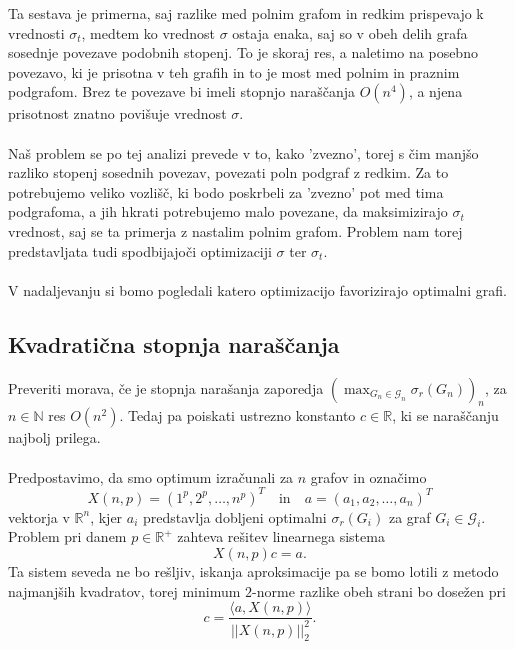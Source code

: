 \documentclass[ letterpaper, titlepage, fleqn]{article}
\begin{document}
Ta sestava je primerna, saj razlike med polnim grafom in redkim prispevajo 
k vrednosti $\sigma_t$, medtem ko vrednost $\sigma$ ostaja enaka, saj so v obeh
delih grafa sosednje povezave podobnih stopenj. To je skoraj res, a naletimo na posebno povezavo,
ki je prisotna v teh grafih in to je most med polnim in praznim podgrafom. Brez te povezave
bi imeli stopnjo naraščanja $O(n^4)$, a njena prisotnost znatno povišuje vrednost $\sigma$.
\\\\
Naš problem se po tej analizi prevede v to, kako 'zvezno', torej s čim manjšo razliko stopenj sosednih povezav, 
povezati poln podgraf z redkim. 
Za to potrebujemo veliko vozlišč, ki bodo poskrbeli za 'zvezno' pot med tima podgrafoma,  
a jih hkrati potrebujemo malo povezane, da maksimizirajo $\sigma_t$ vrednost, saj se ta primerja
z nastalim polnim grafom. Problem nam torej predstavljata tudi spodbijajoči optimizaciji $\sigma$ ter $\sigma_t$.
\\\\
V nadaljevanju si bomo pogledali katero optimizacijo favorizirajo optimalni grafi.

\subsection{Kvadratična stopnja naraščanja}
Preveriti morava, če je stopnja narašanja zaporedja
$(\max_{G_n \in \mathscr{G}_n} \sigma_r(G_n))_n$, za $n \in \mathbb{N}$
res $O(n^2)$. Tedaj pa poiskati ustrezno konstanto $c \in \mathbb{R}$, ki 
se naraščanju najbolj prilega.
\\\\
Predpostavimo, da smo optimum izračunali za $n$ grafov in označimo 
$$X(n, p) = (1^p, 2^p, \dots, n^p)^T \quad \text{in}\quad a = (a_1, a_2, \dots, a_n)^T$$
vektorja v $\mathbb{R}^{n}$, kjer $a_i$ predstavlja
dobljeni optimalni $\sigma_r(G_i)$ za graf $G_i \in \mathscr{G}_i$.
Problem pri danem $p \in \mathbb{R}^{+}$ zahteva rešitev linearnega sistema 
$$X(n, p)c = a.$$
Ta sistem seveda ne bo rešljiv, iskanja aproksimacije pa se bomo
lotili z metodo najmanjših kvadratov, torej minimum $2$-norme
razlike obeh strani bo dosežen pri
$$c = \frac{\langle a, X(n, p)\rangle}{||X(n, p)||_{2}^2}.$$
\end{document}
